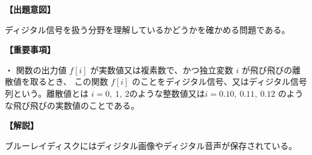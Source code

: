 \noindent \textbf{【出題意図】}

\noindent ディジタル信号を扱う分野を理解しているかどうかを確かめる問題である。

\vspace{1em}
\noindent \textbf{【重要事項】}

\medskip
\noindent ・ 関数の出力値 $f[i]$ が実数値又は複素数で、かつ独立変数 $i$ が飛び飛びの離散値を取るとき、 この関数 $f[i]$ のことをディジタル信号、又はディジタル信号列という。離散値とは $i=0,\ 1,\ 2$のような整数値又は$i=0.10,\ 0.11,\ 0.12$ のような飛び飛びの実数値のことである。

\vspace{1em}
\noindent \textbf{【解説】}

\noindent ブルーレイディスクにはディジタル画像やディジタル音声が保存されている。

